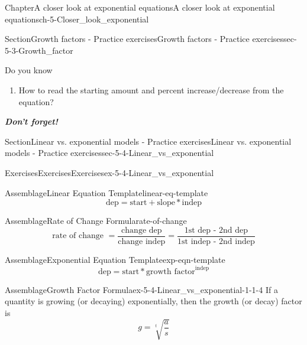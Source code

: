\documentclass[twoside,11pt,]{book}
\newcommand{\alert}[1]{\textbf{\textit{#1}}}
\numberwithin{equation}{section}
\begin{document}
\begin{chapterptx}{Chapter}{A closer look at exponential equations}{}{A closer look at exponential equations}{}{}{ch-5-Closer_look_exponential}
\begin{sectionptx}{Section}{Growth factors - Practice exercises}{}{Growth factors - Practice exercises}{}{}{sec-5-3-Growth_factor}
\begin{conclusion}{Do you know \textellipsis{}}
\begin{enumerate}[label={\Alph*.}]
\item{}How to read the starting amount and percent increase\slash{}decrease from the equation?%
\end{enumerate}
%
\par
\alert{Don't forget!}%
\end{conclusion}%
\end{sectionptx}
%
%
\typeout{************************************************}
\typeout{************************************************}
%
\begin{sectionptx}{Section}{Linear vs. exponential models - Practice exercises}{}{Linear vs. exponential models - Practice exercises}{}{}{sec-5-4-Linear_vs_exponential}
%
%
\typeout{************************************************}
\typeout{************************************************}
%
\begin{exercises-subsection-numberless}{Exercises}{Exercises}{}{Exercises}{}{}{ex-5-4-Linear_vs_exponential}
\begin{assemblage}{Assemblage}{Linear Equation Template}{linear-eq-template}%
%
\begin{equation*}
\text{dep} = \text{start} + \text{slope} \ast \text{indep}
\end{equation*}
%
\end{assemblage}
 \begin{assemblage}{Assemblage}{Rate of Change Formula}{rate-of-change}%
%
\begin{equation*}
\text{rate of change } = \frac{\text{change dep}}{\text{change indep}} = \frac{\text{1st dep - 2nd dep}}{\text{1st indep - 2nd indep}}
\end{equation*}
%
\end{assemblage}
 \begin{assemblage}{Assemblage}{Exponential Equation Template}{exp-eqn-template}%
%
\begin{equation*}
\text{dep} = \text{start} \ast \text{growth factor} ^ {\text{indep}}
\end{equation*}
%
\end{assemblage}
 \begin{assemblage}{Assemblage}{Growth Factor Formula}{ex-5-4-Linear_vs_exponential-1-1-4}%
If a quantity is growing (or decaying) exponentially, then the growth (or decay) factor is%
\begin{equation*}
\displaystyle g = \sqrt[t]{\frac{a}{s}}
\end{equation*}

\end{assemblage}
\end{exercises-subsection-numberless}
\end{sectionptx}
\end{chapterptx}
\end{document}
